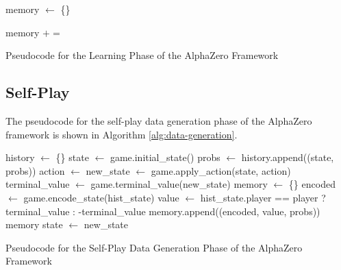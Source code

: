\begin{algorithm}[htb]
\begin{algorithmic}
            \State memory $\gets$ \{\}

                \State memory $+=$  
            \EndFor
            
                \State {}
            \EndFor
        \EndFor
    \EndFunction
    \caption{Pseudocode for the Learning Phase of the AlphaZero Framework}
    \label{alg:learning_phase}
\end{algorithmic}
\end{algorithm}

\subsection{Self-Play}

The pseudocode for the  self-play data generation phase of the AlphaZero framework is shown in Algorithm \ref{alg:data-generation}.

\begin{algorithm}[htb]
    \begin{algorithmic}[1]
            \State history $\gets$ \{\}
            \State state $\gets$ game.initial\_state()
            \Loop
                \State probs $\gets$ 
                \State history.append((state, probs)) 
                \State action $\gets$ 
                \State new\_state $\gets$ game.apply\_action(state, action)
                \State terminal\_value $\gets$ game.terminal\_value(new\_state)
                    \State memory $\gets$ \{\}
                        \State encoded $\gets$ game.encode\_state(hist\_state)
                        \State value $\gets$ hist\_state.player == player ? terminal\_value : -terminal\_value
                        \State memory.append((encoded, value, probs))
                    \EndFor
                    \State \Return memory
                \EndIf
                \State state $\gets$ new\_state
            \EndLoop
        \EndFunction
    \end{algorithmic}
    \caption{Pseudocode for the Self-Play Data Generation Phase of the AlphaZero Framework}
    \label{alg:data-generation}
\end{algorithm}


